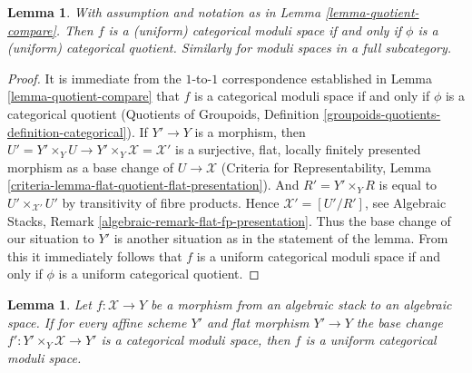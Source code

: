 \documentclass[10pt,a4paper]{amsart}
\theoremstyle{plain}
\newtheorem{lemma}[subsection]{Lemma}
\theoremstyle{definition}
\theoremstyle{remark}
\numberwithin{equation}{subsection}
\begin{document}
\begin{lemma}
\label{lemma-categorical-quotient-compare}
With assumption and notation as in Lemma \ref{lemma-quotient-compare}.
Then $f$ is a (uniform) categorical moduli space
if and only if $\phi$ is a (uniform) categorical quotient.
Similarly for moduli spaces in a full subcategory.
\end{lemma}

\begin{proof}
It is immediate from the $1$-to-$1$ correspondence established in
Lemma \ref{lemma-quotient-compare} that $f$ is a categorical moduli space
if and only if $\phi$ is a categorical quotient
(Quotients of Groupoids, Definition
\ref{groupoids-quotients-definition-categorical}).
If $Y' \to Y$ is a morphism, then
$U' = Y' \times_Y U \to Y' \times_Y \mathcal{X} = \mathcal{X}'$
is a surjective, flat, locally finitely presented morphism
as a base change of $U \to \mathcal{X}$
(Criteria for Representability, Lemma
\ref{criteria-lemma-flat-quotient-flat-presentation}).
And $R' = Y' \times_Y R$ is equal to $U' \times_{\mathcal{X}'} U'$
by transitivity of fibre products.
Hence $\mathcal{X}' = [U'/R']$, see
Algebraic Stacks, Remark \ref{algebraic-remark-flat-fp-presentation}.
Thus the base change of our situation to $Y'$ is another situation
as in the statement of the lemma. From this it immediately
follows that $f$ is a uniform categorical moduli space
if and only if $\phi$ is a uniform categorical quotient.
\end{proof}

\begin{lemma}
\label{lemma-check-uniform-categorical-quotient-on-affines}
Let $f : \mathcal{X} \to Y$ be a morphism from an algebraic stack
to an algebraic space. If for every affine scheme $Y'$ and flat
morphism $Y' \to Y$ the base change
$f' : Y' \times_Y \mathcal{X} \to Y'$ is a categorical moduli space,
then $f$ is a uniform categorical moduli space.
\end{lemma}
\end{document}
